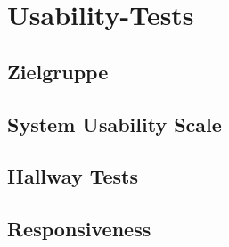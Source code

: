 \section{Usability-Tests}
\subsection{Zielgruppe}
\subsection{System Usability Scale}
\subsection{Hallway Tests}
\subsection{Responsiveness}